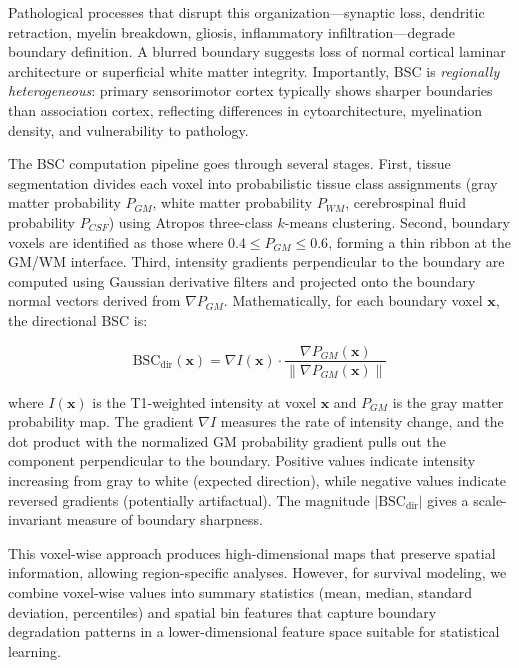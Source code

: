 \documentclass[blue]{ludusofficial}  %
\begin{document}
Pathological processes that disrupt this organization—synaptic loss, dendritic retraction, myelin breakdown, gliosis, inflammatory infiltration—degrade boundary definition. A blurred boundary suggests loss of normal cortical laminar architecture or superficial white matter integrity. Importantly, BSC is \textit{regionally heterogeneous}: primary sensorimotor cortex typically shows sharper boundaries than association cortex, reflecting differences in cytoarchitecture, myelination density, and vulnerability to pathology.

The BSC computation pipeline goes through several stages. First, tissue segmentation divides each voxel into probabilistic tissue class assignments (gray matter probability $P_{GM}$, white matter probability $P_{WM}$, cerebrospinal fluid probability $P_{CSF}$) using Atropos three-class $k$-means clustering. Second, boundary voxels are identified as those where $0.4 \leq P_{GM} \leq 0.6$, forming a thin ribbon at the GM/WM interface. Third, intensity gradients perpendicular to the boundary are computed using Gaussian derivative filters and projected onto the boundary normal vectors derived from $\nabla P_{GM}$. Mathematically, for each boundary voxel $\mathbf{x}$, the directional BSC is:

\begin{equation}
    \text{BSC}_{\text{dir}}(\mathbf{x}) = \nabla I(\mathbf{x}) \cdot \frac{\nabla P_{GM}(\mathbf{x})}{\|\nabla P_{GM}(\mathbf{x})\|}
\end{equation}

where $I(\mathbf{x})$ is the T1-weighted intensity at voxel $\mathbf{x}$ and $P_{GM}$ is the gray matter probability map. The gradient $\nabla I$ measures the rate of intensity change, and the dot product with the normalized GM probability gradient pulls out the component perpendicular to the boundary. Positive values indicate intensity increasing from gray to white (expected direction), while negative values indicate reversed gradients (potentially artifactual). The magnitude $|\text{BSC}_{\text{dir}}|$ gives a scale-invariant measure of boundary sharpness.

This voxel-wise approach produces high-dimensional maps that preserve spatial information, allowing region-specific analyses. However, for survival modeling, we combine voxel-wise values into summary statistics (mean, median, standard deviation, percentiles) and spatial bin features that capture boundary degradation patterns in a lower-dimensional feature space suitable for statistical learning.
\end{document}
